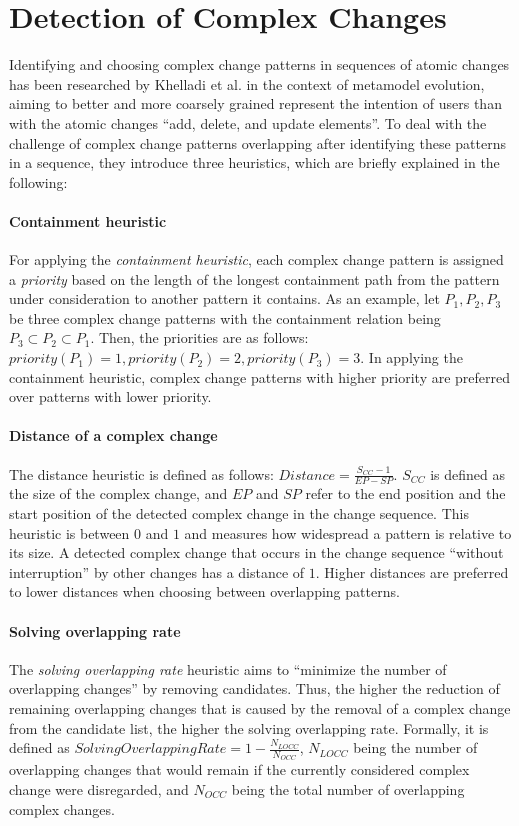 \section{Detection of Complex Changes}
\label{sec:Foundations:ComplexChangeDetection}
Identifying and choosing complex change patterns in sequences of atomic changes has been researched by Khelladi et al. \cite{khelladi_detecting_complex_changes_2015} in the context of metamodel evolution, aiming to better and more coarsely grained represent the intention of users than with the atomic changes \enquote{add, delete, and update elements}.
To deal with the challenge of complex change patterns overlapping after identifying these patterns in a sequence, they introduce three heuristics, which are briefly explained in the following:

\paragraph{Containment heuristic} For applying the \emph{containment heuristic}, each complex change pattern is assigned a \emph{priority} based on the length of the longest containment path from the pattern under consideration to another pattern it contains. As an example, let $P_1,P_2,P_3$ be three complex change patterns with the containment relation being $P_3 \subset P_2 \subset P_1$. Then, the priorities are as follows: $priority(P_1)=1, priority(P_2)=2,priority(P_3)=3$.
In applying the containment heuristic, complex change patterns with higher priority are preferred over patterns with lower priority.

\paragraph{Distance of a complex change} The distance heuristic is defined as follows: $Distance = \frac{S_{CC}-1}{EP-SP}$. $S_{CC}$ is defined as the size of the complex change, and $EP$ and $SP$ refer to the end position and the start position of the detected complex change in the change sequence. This heuristic is between $0$ and $1$ and measures how widespread a pattern is relative to its size. A detected complex change that occurs in the change sequence \enquote{without interruption} by other changes has a distance of $1$. Higher distances are preferred to lower distances when choosing between overlapping patterns.

\paragraph{Solving overlapping rate} The \emph{solving overlapping rate} heuristic aims to \enquote{minimize the number of overlapping changes} by removing candidates. Thus, the higher the reduction of remaining overlapping changes that is caused by the removal of a complex change from the candidate list, the higher the solving overlapping rate.
Formally, it is defined as $SolvingOverlappingRate = 1 - \frac{N_{LOCC}}{N_{OCC}}$, $N_{LOCC}$ being the number of overlapping changes that would remain if the currently considered complex change were disregarded, and $N_{OCC}$ being the total number of overlapping complex changes.
